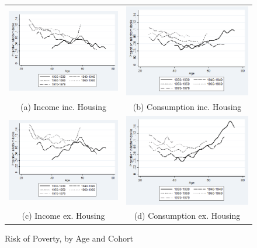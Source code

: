 \begin{figure}
\caption{Risk of Poverty, by Age and Cohort }
\centering
\begin{tabular}{c c}
\includegraphics[width=.5\linewidth]{pictures/cohortagerisksmooth_bhc_inc.png} &
\includegraphics[width=.5\linewidth]{pictures/cohortagerisksmooth_bhc_con.png} \\
(a) Income inc. Housing & (b) Consumption inc. Housing \\
\includegraphics[width=.5\linewidth]{pictures/cohortagerisksmooth_ahc_inc.png} &
\includegraphics[width=.5\linewidth]{pictures/cohortagerisksmooth_ahc_con.png} \\
(c) Income ex. Housing & (d) Consumption ex. Housing \\
\end{tabular}
\label{fig:povage_cohort}
\end{figure}

